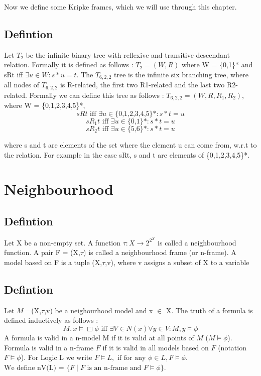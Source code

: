 \documentclass[12pt, a4paper]{scrreprt}
\begin{document}
Now we define some Kripke frames, which we will use through this chapter.

\section{Defintion}
Let $T_2$ be the infinite binary tree with reflexive and transitive descendant relation. \newline Formally it is defined as follows :
$T_2 = (W,R)$ where W = \{0,1\}* and sRt iff $\exists u\in W : s*u = t$. \newline
The $T_ {6,2,2}$ tree is the infinite six branching tree, where all nodes of $T_ {6,2,2}$ is R-related, the first two R1-related 
and the last two R2-related. Formally we can define this tree as follows : $T_ {6,2,2} = (W,R,R_1,R_2)$,
where W = \{{0,1,2,3,4,5}\}*, $$sRt \mbox{ iff } \exists u \in \mbox{\{0,1,2,3,4,5\}*} : s*t = u $$
$$ sR_1t  \mbox{ iff } \exists u \in \mbox{\{0,1\}*} : s*t = u$$
$$ sR_2t  \mbox{ iff } \exists u \in \mbox{\{5,6\}*} : s*t = u$$

where s and t are elements of the set where the element u can come from, w.r.t to the relation. For example in the case sRt,
s and t are elements of \{0,1,2,3,4,5\}*.





\chapter{Neighbourhood} 

\section{Defintion} 
Let X be a non-empty set. A function  $\tau : X \rightarrow 2^{2^X}$ is called a neighbourhood function. A pair 
F = (X,$\tau$) is called a neighbourhood frame (or n-frame). A model based on F is a tuple (X,$\tau$,v), where v assigns a subset of X to a variable

\section{Defintion}

Let $M$ =(X,$\tau$,v) be a neighourhood model and x $\in$ X. The truth of a formula is defined inductively as follows :
$$M,x \models \Box \phi \mbox{ iff } \exists V \in N(x) \forall y \in V : M,y \models \phi$$ 
A formula is valid in a n-model M if it is valid at all points of $M$ ($M \models \phi$). Formula is valid in a n-frame $F$ if it is valid in
all models based on $F$ (notation $F \models \phi$). For Logic L we write $ F \models L, \mbox{ if for any }\phi \in L, F \models \phi$. 
$\mbox{We define nV(L) =  } \{ F \mid F \mbox{ is an n-frame and } F \models \phi \}$.
\end{document}
